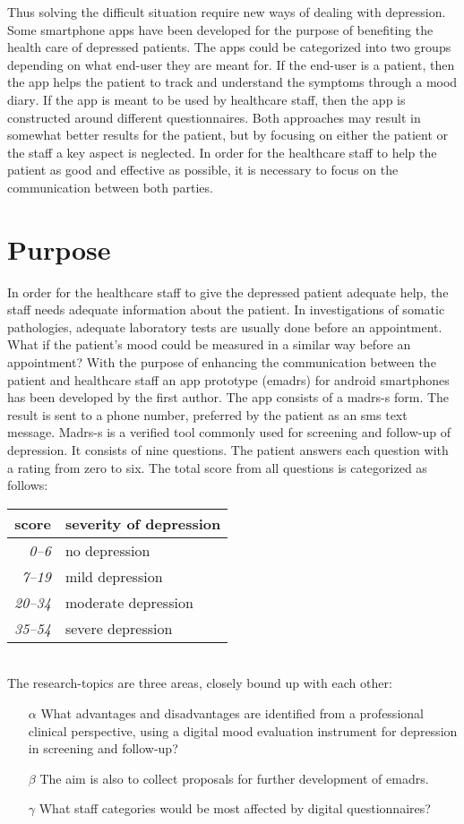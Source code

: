 \documentclass[12pt,a4paper,oneside]{article}
\let\oldcite\cite
\renewcommand*\cite[1]{\textsuperscript{\oldcite{#1}}}
\begin{document}
Thus solving the difficult situation require new ways of dealing with depression. Some smartphone apps have been developed for the purpose of benefiting the health care of depressed patients. The apps could be categorized into two groups depending on what end-user they are meant for. If the end-user is a patient, then the app helps the patient to track and understand the symptoms through a mood diary\cite{app1}. If the app is meant to be used by healthcare staff, then the app is constructed around different questionnaires\cite{app2}. Both approaches may result in somewhat better results for the patient, but by focusing on either the patient or the staff a key aspect is neglected. In order for the healthcare staff to help the patient as good and effective as possible, it is necessary to focus on the communication between both parties.

\section*{Purpose}
In order for the healthcare staff to give the depressed patient adequate help, the staff needs adequate information about the patient. In investigations of somatic pathologies, adequate laboratory tests are usually done before an appointment. What if the patient's mood could be measured in a similar way before an appointment? With the purpose of enhancing the communication between the patient and healthcare staff an app prototype (e{\sc madrs}) for android smartphones has been developed by the first author\cite{emadrs1, emadrs2}. The app consists of a {\sc madrs-s} form. The result is sent to a phone number, preferred by the patient as an {\sc sms} text message. {\sc Madrs-s} is a verified tool commonly used for screening and follow-up of depression\cite{madrs2,madrs3}. It consists of nine questions. The patient answers each question with a rating from zero to six. The total score from all questions is categorized as follows:\\

\begin{tabular}{r|l}
{\bf score} & {\bf severity of depression}\\
\hline{\it 0--6} &  no depression\\
{\it 7--19} & mild depression\\
{\it 20--34} & moderate depression\\
{\it 35--54} & severe depression\\
\end{tabular}\vspace{1em}
\\The research-topics are three areas, closely bound up with each other:
\begin{itemize}
\item[$\alpha$] What advantages and disadvantages are identified from a professional clinical perspective, using a digital mood evaluation instrument for depression in screening and follow-up?
\item[$\beta$] The aim is also to collect proposals for further development of e{\sc madrs}.
\item[$\gamma$] What staff categories would be most affected by digital questionnaires?
\end{itemize}
\end{document}
